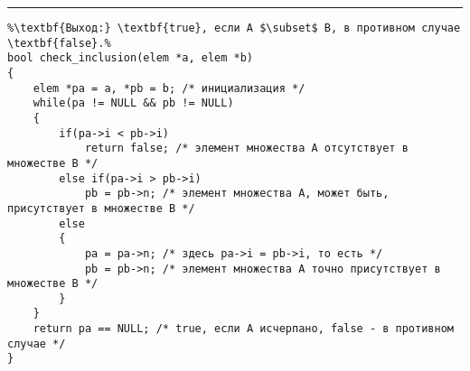 \vspace{5pt} \hrule
\begin{lstlisting}[caption={Проверка включения слиянием}, label=p_42, escapechar=\%]
%\noindent\textbf{Вход:} Проверяемые множества A и B, которые заданы указателями a и b.\\%
%\textbf{Выход:} \textbf{true}, если A $\subset$ B, в противном случае \textbf{false}.%
bool check_inclusion(elem *a, elem *b)
{
	elem *pa = a, *pb = b; /* инициализация */
	while(pa != NULL && pb != NULL)
	{
		if(pa->i < pb->i)
			return false; /* элемент множества A отсутствует в множестве B */
		else if(pa->i > pb->i)
			pb = pb->n; /* элемент множества A, может быть, присутствует в множестве B */
		else
		{
			pa = pa->n; /* здесь pa->i = pb->i, то есть */
			pb = pb->n; /* элемент множества A точно присутствует в множестве B */
		}
	}
	return pa == NULL; /* true, если A исчерпано, false - в противном случае */
}
\end{lstlisting}
